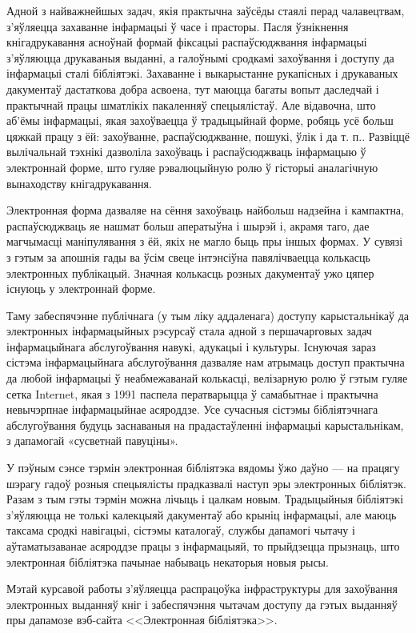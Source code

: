 \sectionWithoutNumber{\prefacename}

Адной з найважнейшых задач, якія практычна заўсёды стаялі перад
чалавецтвам, з'яўляецца захаванне інфармацыі ў часе і прасторы. Пасля ўзнікнення кнігадрукавання асноўнай формай
фіксацыі распаўсюджвання інфармацыі з'яўляюцца друкаваныя выданні, а
галоўнымі сродкамі захоўвання і доступу да інфармацыі сталі
бібліятэкі. Захаванне і выкарыстанне рукапісных і друкаваных дакументаў дастаткова добра асвоена, тут маюцца багаты вопыт
даследчай і практычнай працы шматлікіх пакаленняў
спецыялістаў. Але відавочна, што аб'ёмы інфармацыі, якая захоўваецца ў
традыцыйнай форме, робяць усё больш цяжкай працу з ёй:
захоўванне, распаўсюджванне, пошукі, ўлік і да т. п..
Развіццё
вылічальнай тэхнікі дазволіла захоўваць і распаўсюджваць
інфармацыю ў электроннай форме, што гуляе рэвалюцыйную ролю ў гісторыі аналагічную вынаходству кнігадрукавання.

Электронная форма дазваляе на сёння захоўваць найбольш надзейна і кампактна, распаўсюджваць яе нашмат больш аператыўна і шырэй і, акрамя таго, дае магчымасці маніпулявання з ёй, якіх не магло быць пры іншых формах. У сувязі з гэтым за апошнія гады ва ўсім свеце інтэнсіўна павялічваецца колькасць электронных публікацый. Значная колькасць розных дакументаў ужо цяпер існуюць у электроннай форме.

Таму забеспячэнне публічнага (у тым ліку аддаленага) доступу карыстальнікаў да электронных інфармацыйных рэсурсаў стала адной з першачарговых задач інфармацыйнага абслугоўвання навукі, адукацыі і культуры. Існуючая зараз сістэма інфармацыйнага абслугоўвання дазваляе нам атрымаць доступ практычна да любой інфармацыі ў неабмежаванай колькасці, велізарную ролю ў гэтым гуляе сетка Internet, якая з 1991 паспела ператварыцца ў самабытнае і практычна невычэрпнае інфармацыйнае асяроддзе. Усе сучасныя сістэмы бібліятэчнага абслугоўвання будуць заснаваныя на прадастаўленні інфармацыі карыстальнікам, з дапамогай «сусветнай павуціны».

У пэўным сэнсе тэрмін электронная бібліятэка вядомы ўжо даўно --- на працягу шэрагу гадоў розныя спецыялісты прадказвалі наступ эры электронных бібліятэк. Разам з тым гэты тэрмін можна лічыць і цалкам новым. Традыцыйныя бібліятэкі з'яўляюцца не толькі калекцыяй дакументаў або крыніц інфармацыі, але маюць таксама сродкі навігацыі, сістэмы каталогаў, службы дапамогі чытачу і аўтаматызаванае асяроддзе працы з інфармацыяй, то прыйдзецца прызнаць, што электронная бібліятэка пачынае набываць некаторыя новыя рысы.

Мэтай курсавой работы з'яўляецца распрацоўка інфраструктуры для захоўвання электронных выданняў кніг і
забеспячэння чытачам доступу да гэтых выданняў пры дапамозе вэб-сайта <<Электронная бібліятэка>>.
